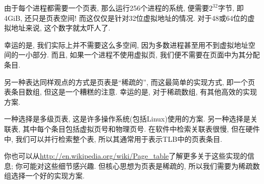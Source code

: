 \documentclass[12pt]{book}
\begin{document}
{由于每个进程都需要一个页表, 
那么运行256个进程的系统, 便需要$2^{32}$字节, 即 4GiB, 还只是页表空间!
而这仅仅是针对32位虚拟地址的情况.
对于48或64位的虚拟地址来说, 这个数字就太吓人了.


%
%
幸运的是, 我们实际上并不需要这么多空间,
因为多数进程甚至用不到虚拟地址空间的一小部分.
而且, 如果一个进程不使用虚拟页, 我们便不需要在页面中为其分配条目.

另一种表达同样观点的方式是页表是``稀疏的'',
而这最简单的实现方式, 即一个页表条目数组, 但这是一个糟糕的注意.
幸运的是, 对于稀疏数组, 有其他高效的实现方案.

一种选择是多级页表, 这是许多操作系统(包括Linux)使用的方案.
另一种选择是关联表, 其中每个条目包括虚拟页号和物理页号.
在软件中检索关联表很慢, 但在硬件中, 我们可以并行检索整个表,
所以其通常用于表示TLB中的页表条目.


%
你也可以从\url{http://en.wikipedia.org/wiki/Page_table}了解更多关于这些实现的信息;
你可能对这些细节感兴趣.
但核心思想为页表是稀疏的, 所以我们需要为稀疏数组选择一个好的实现方案.

}
\end{document}
